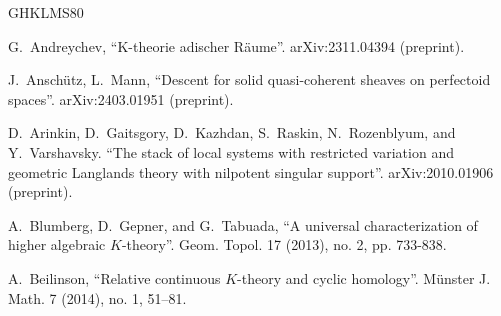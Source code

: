 \documentclass[11pt,leqno]{amsart}
\numberwithin{equation}{section}
\begin{document}
\begin{thebibliography}{GHKLMS80}


G.~Andreychev, ``K-theorie adischer R\"aume''. arXiv:2311.04394 (preprint).

J.~Ansch\"utz, L.~Mann, ``Descent for solid quasi-coherent sheaves on perfectoid spaces''. arXiv:2403.01951 (preprint).

 D.~Arinkin, D.~Gaitsgory, D.~Kazhdan, S.~Raskin, N.~Rozenblyum, and Y.~Varshavsky. ``The stack of local systems with restricted variation and geometric Langlands theory with nilpotent singular support''. arXiv:2010.01906 (preprint).





 A.~Blumberg, D.~Gepner, and G.~Tabuada, ``A universal characterization of higher algebraic $K$-theory''. Geom. Topol.
17 (2013), no. 2, pp. 733-838.




 A.~Beilinson, ``Relative continuous $K$-theory and cyclic homology''. M\"unster J. Math. 7 (2014), no. 1, 51–81.


\end{thebibliography}
\end{document}
